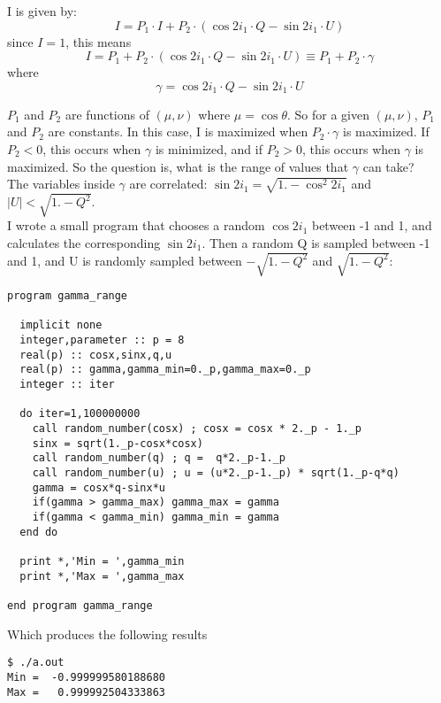 \documentclass[11pt]{article}
\begin{document}
I is given by:
\begin{equation*}
  I = P_1 \cdot I + P_2 \cdot (\cos{2i_1} \cdot Q - \sin{2i_1} \cdot U)
\end{equation*}
since $I = 1$, this means
\begin{equation*}
  I = P_1 + P_2 \cdot (\cos{2i_1} \cdot Q - \sin{2i_1} \cdot U) \equiv P_1 + P_2  \cdot \gamma
\end{equation*}
where
\begin{equation*}
\gamma = \cos{2i_1} \cdot Q - \sin{2i_1} \cdot U
\end{equation*}

$P_1$ and $P_2$ are functions of $(\mu,\nu)$ where $\mu=\cos{\theta}$. So for a given $(\mu,\nu)$, $P_1$ and $P_2$ are constants. In this case, I is maximized when $P_2\cdot\gamma$ is maximized. If $P_2 < 0$, this occurs when $\gamma$ is minimized, and if $P_2 > 0$, this occurs when $\gamma$ is maximized. So the question is, what is the range of values that $\gamma$ can take?\\

The variables inside $\gamma$ are correlated: $\sin{2i_1} = \sqrt{1.-\cos^2{2i_1}}$ and $|U| < \sqrt{1. - Q^2}$.\\

I wrote a small program that chooses a random $\cos{2i_1}$ between -1 and 1, and calculates the corresponding $\sin{2i_1}$. Then a random Q is sampled between -1 and 1, and U is randomly sampled between $-\sqrt{1. - Q^2}$ and $\sqrt{1. - Q^2}$:
\begin{verbatim}
program gamma_range
  
  implicit none
  integer,parameter :: p = 8
  real(p) :: cosx,sinx,q,u
  real(p) :: gamma,gamma_min=0._p,gamma_max=0._p
  integer :: iter
  
  do iter=1,100000000
    call random_number(cosx) ; cosx = cosx * 2._p - 1._p
    sinx = sqrt(1._p-cosx*cosx)
    call random_number(q) ; q =  q*2._p-1._p
    call random_number(u) ; u = (u*2._p-1._p) * sqrt(1._p-q*q)
    gamma = cosx*q-sinx*u
    if(gamma > gamma_max) gamma_max = gamma
    if(gamma < gamma_min) gamma_min = gamma
  end do
  
  print *,'Min = ',gamma_min
  print *,'Max = ',gamma_max

end program gamma_range
\end{verbatim}

Which produces the following results
\begin{verbatim}
$ ./a.out
Min =  -0.999999580188680     
Max =   0.999992504333863   
\end{verbatim}
\end{document}

